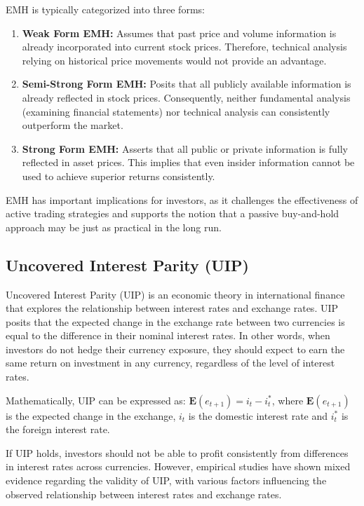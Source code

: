 \documentclass[a4paper,10pt]{article}
\begin{document}
EMH is typically categorized into three forms:

\begin{enumerate}
  \item \textbf{Weak Form EMH:} Assumes that past price and volume information is already incorporated into current stock prices. Therefore, technical analysis relying on historical price movements would not provide an advantage.

  \item \textbf{Semi-Strong Form EMH:} Posits that all publicly available information is already reflected in stock prices. Consequently, neither fundamental analysis (examining financial statements) nor technical analysis can consistently outperform the market.

  \item \textbf{Strong Form EMH:} Asserts that all public or private information is fully reflected in asset prices. This implies that even insider information cannot be used to achieve superior returns consistently.
\end{enumerate}

EMH has important implications for investors, as it challenges the effectiveness of active trading strategies and supports the notion that a passive buy-and-hold approach may be just as practical in the long run.

\subsection{Uncovered Interest Parity (UIP)}\label{appx:uip}

Uncovered Interest Parity (UIP) is an economic theory in international finance that explores the relationship between interest rates and exchange rates. UIP posits that the expected change in the exchange rate between two currencies is equal to the difference in their nominal interest rates. In other words, when investors do not hedge their currency exposure, they should expect to earn the same return on investment in any currency, regardless of the level of interest rates.

Mathematically, UIP can be expressed as: $ \mathbf{E}(e_{t+1}) = i_t - i^*_t $, where \( \mathbf{E}(e_{t+1}) \) is the expected change in the exchange, \( i_t \) is the domestic interest rate and \( i^*_t \) is the foreign interest rate.

If UIP holds, investors should not be able to profit consistently from differences in interest rates across currencies. However, empirical studies have shown mixed evidence regarding the validity of UIP, with various factors influencing the observed relationship between interest rates and exchange rates.
\end{document}
